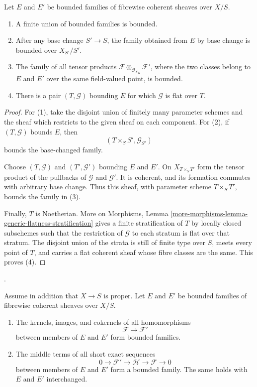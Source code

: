 \begin{lemma}
\label{lemma-bounded-coherent-elementary}
Let $E$ and $E'$ be bounded families of fibrewise coherent sheaves over
$X/S$.
\begin{enumerate}
\item A finite union of bounded families is bounded.
\item After any base change $S' \to S$, the family obtained from $E$ by
base change is bounded over $X_{S'}/S'$.
\item The family of all tensor products
$\mathcal{F} \otimes_{\mathcal{O}_{X_K}} \mathcal{F}'$, where the two
classes belong to $E$ and $E'$ over the same field-valued point, is bounded.
\item There is a pair $(T, \mathcal{G})$ bounding $E$ for which
$\mathcal{G}$ is flat over $T$.
\end{enumerate}
\end{lemma}

\begin{proof}
For (1), take the disjoint union of finitely many parameter schemes and the
sheaf which restricts to the given sheaf on each component. For (2), if
$(T, \mathcal{G})$ bounds $E$, then
$$
(T \times_S S', \mathcal{G}_{S'})
$$
bounds the base-changed family.

Choose $(T, \mathcal{G})$ and $(T', \mathcal{G}')$ bounding $E$ and $E'$.
On $X_{T \times_S T'}$ form the tensor product of the pullbacks of
$\mathcal{G}$ and $\mathcal{G}'$. It is coherent, and its formation
commutes with arbitrary base change. Thus this sheaf, with parameter scheme
$T \times_S T'$, bounds the family in (3).

Finally, $T$ is Noetherian. More on Morphisms, Lemma
\ref{more-morphisms-lemma-generic-flatness-stratification} gives a finite
stratification of $T$ by locally closed subschemes such that the restriction
of $\mathcal{G}$ to each stratum is flat over that stratum. The disjoint
union of the strata is still of finite type over $S$, meets every point of
$T$, and carries a flat coherent sheaf whose fibre classes are the same.
This proves (4).
\end{proof}

\begin{proposition}
\label{proposition-bounded-coherent-morphisms-extensions}
\begin{reference}
\cite[Expos\'e 221, Proposition 1.2, pp. 252--253]{FGA}.
\end{reference}
Assume in addition that $X \to S$ is proper. Let $E$ and $E'$ be bounded
families of fibrewise coherent sheaves over $X/S$.
\begin{enumerate}
\item The kernels, images, and cokernels of all homomorphisms
$$
\mathcal{F} \longrightarrow \mathcal{F}'
$$
between members of $E$ and $E'$ form bounded families.
\item The middle terms of all short exact sequences
$$
0 \longrightarrow \mathcal{F}' \longrightarrow \mathcal{H}
\longrightarrow \mathcal{F} \longrightarrow 0
$$
between members of $E$ and $E'$ form a bounded family. The same holds with
$E$ and $E'$ interchanged.
\end{enumerate}
\end{proposition}

